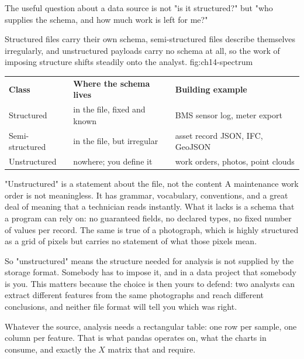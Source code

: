 
The useful question about a data source is not "is it structured?" but "who
supplies the schema, and how much work is left for me?"

{Structured files carry their own schema, semi-structured files describe themselves irregularly, and unstructured payloads carry no schema at all, so the work of imposing structure shifts steadily onto the analyst.}
{fig:ch14-spectrum}

\begin{center}
\begin{tabular}{lll}
\textbf{Class} & \textbf{Where the schema lives} & \textbf{Building example} \\
Structured & in the file, fixed and known & BMS sensor log, meter export \\
Semi-structured & in the file, but irregular & asset record JSON, IFC, GeoJSON \\
Unstructured & nowhere; you define it & work orders, photos, point clouds \\
\end{tabular}
\end{center}

\begin{ExplainBox}{"Unstructured" is a statement about the file, not the content}
A maintenance work order is not meaningless. It has grammar, vocabulary,
conventions, and a great deal of meaning that a technician reads instantly. What
it lacks is a schema that a program can rely on: no guaranteed fields, no
declared types, no fixed number of values per record. The same is true of a
photograph, which is highly structured as a grid of pixels but carries no
statement of what those pixels mean.

So "unstructured" means the structure needed for analysis is not supplied by the
storage format. Somebody has to impose it, and in a data project that somebody
is you. This matters because the choice is then yours to defend: two analysts
can extract different features from the same photographs and reach different
conclusions, and neither file format will tell you which was right.
\end{ExplainBox}


Whatever the source, analysis needs a rectangular table: one row per sample, one
column per feature. That is what pandas operates on, what the charts in
 consume, and exactly the $X$ matrix that
 and  require.


